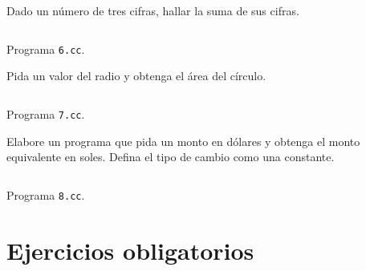 \documentclass[spanish,addpoints,answers,a4paper]{exam}
\begin{document}
\begin{questions}
\question Dado un número de tres cifras, hallar la suma de sus cifras.

\begin{solution}
	\begin{listing}[H]
		\footnotesize
		\inputminted{cpp}{6.cc}
		\caption{Programa \texttt{6.cc}.}
		\label{lst:1.6}
	\end{listing}
\end{solution}

\question Pida un valor del radio y obtenga el área del círculo.

\begin{solution}
		\begin{listing}[H]
		\footnotesize
		\inputminted{cpp}{7.cc}
		\caption{Programa \texttt{7.cc}.}
		\label{lst:1.7}
	\end{listing}
\end{solution}

\question Elabore un programa que pida un monto en dólares y obtenga el monto equivalente en soles. Defina el tipo de cambio como una constante.

\begin{solution}
	\begin{listing}[H]
		\footnotesize
		\inputminted{cpp}{8.cc}
		\caption{Programa \texttt{8.cc}.}
		\label{lst:1.8}
	\end{listing}
\end{solution}

\end{questions}

\section*{Ejercicios obligatorios}
\end{document}

